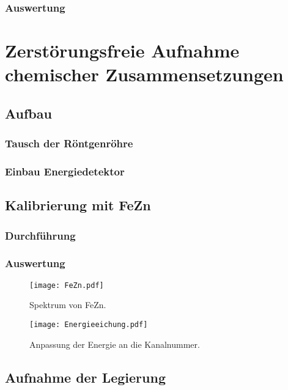 \subsection{Auswertung}

\chapter{Zerstörungsfreie Aufnahme chemischer Zusammensetzungen}

\section{Aufbau}

\subsection{Tausch der Röntgenröhre}

\subsection{Einbau Energiedetektor}

\section{Kalibrierung mit FeZn}

\subsection{Durchführung}

\subsection{Auswertung}

\begin{figure}[htbp]
    \centering
    \texttt{[image: FeZn.pdf]}
    \caption{%
        Spektrum von FeZn.
    }
    \label{fig:FeZn}
\end{figure}

\begin{figure}[htbp]
    \centering
    \texttt{[image: Energieeichung.pdf]}
    \caption{%
        Anpassung der Energie an die Kanalnummer.
    }
    \label{fig:}
\end{figure}

\section{Aufnahme der Legierung}

